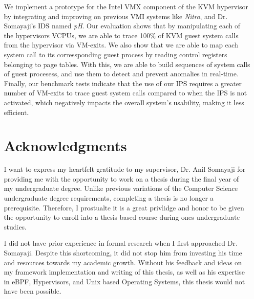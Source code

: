 \documentclass{report}
\begin{document}
\begin{spacing}{1.5}
{\large
\noindent We implement a prototype for the Intel VMX component of the KVM hypervisor by integrating and improving on previous VMI systems like \textit{Nitro}, and Dr. Somayaji's IDS named \textit{pH}. Our evaluation shows that by manipulating each of the hypervisors VCPUs, we are able to trace 100\% of KVM guest system calls from the hypervisor via VM-exits. We also show that we are able to map each system call to its corressponding guest process by reading control registers belonging to page tables. With this, we are able to build sequences of system calls of guest procesess, and use them to detect and prevent anomalies in real-time. Finally, our benchmark tests indicate that the use of our IPS requires a greater number of VM-exits to trace guest system calls compared to when the IPS is not activated, which negatively impacts the overall system's usability, making it less efficient.
\newline
}

\setcounter{tocdepth}{2}
\setcounter{secnumdepth}{2}














\newpage

\chapter*{Acknowledgments}

{\large 
I want to express my heartfelt gratitude to my supervisor, Dr. Anil Somayaji for providing me with the opportunity to work on a thesis during the final year of my undergraduate degree. Unlike previous variations of the Computer Science undergraduate degree requirements, completing a thesis is no longer a prerequisite. Therefore, I prostualte it is a great privlidge and honor to be given the opportunity to enroll into a thesis-based course during ones undergraduate studies.
\leavevmode\newline
}

{\large 
\noindent I did not have prior experience in formal research when I first approached Dr. Somayaji. Despite this shortcoming, it did not stop him from investing his time and resources towards my academic growth. Without his feedback and ideas on my framework implementation and writing of this thesis, as well as his expertise in eBPF, Hypervisors, and Unix based Operating Systems, this thesis would not have been possible.
\leavevmode\newline
}


\end{spacing}
\end{document}

